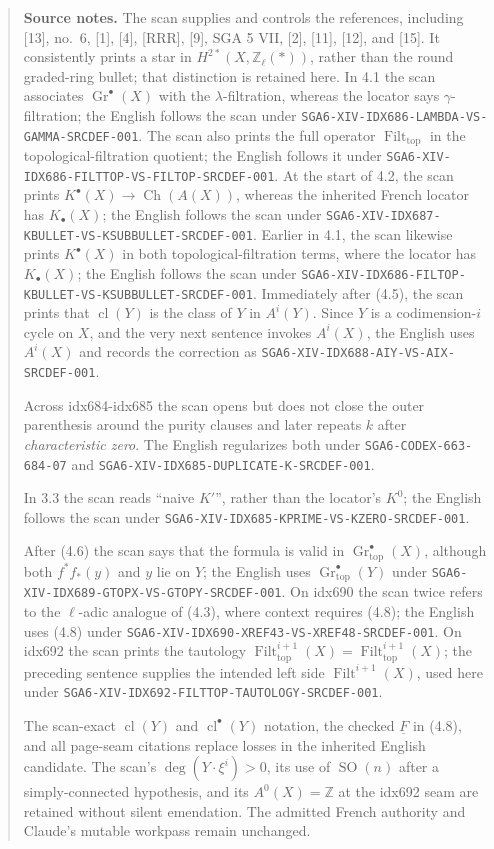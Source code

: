 \documentclass[11pt]{article}
\newcommand{\Z}{\mathbb Z}
\newcommand{\Zell}{\mathbb Z_{\ell}}
\newcommand{\Gtop}{\operatorname{Gr}_{\mathrm{top}}}
\newcommand{\Filt}{\operatorname{Filt}}
\newcommand{\Ch}{\operatorname{Ch}}
\newcommand{\cl}{\operatorname{cl}}
\begin{document}
\begin{quote}\footnotesize\raggedright
\textbf{Source notes.}
The scan supplies and controls the references, including [13], no.~6, [1],
[4], [RRR], [9], SGA 5 VII, [2], [11], [12], and [15]. It consistently
prints a star in $H^{2*}(X,\Zell(*))$, rather than the round graded-ring
bullet; that distinction is retained here. In 4.1 the scan associates
$\operatorname{Gr}^\bullet(X)$ with the $\lambda$-filtration, whereas the
locator says $\gamma$-filtration; the English follows the scan under
\nolinkurl{SGA6-XIV-IDX686-LAMBDA-VS-GAMMA-SRCDEF-001}. The scan also prints
the full operator $\Filt_{\mathrm{top}}$ in the topological-filtration
quotient; the English follows it under
\nolinkurl{SGA6-XIV-IDX686-FILTTOP-VS-FILTOP-SRCDEF-001}. At the start of 4.2,
the scan
prints $K^\bullet(X)\to\Ch(A(X))$, whereas the inherited French locator has
$K_\bullet(X)$; the English follows the scan under
\nolinkurl{SGA6-XIV-IDX687-KBULLET-VS-KSUBBULLET-SRCDEF-001}. Earlier in 4.1, the
scan likewise prints $K^\bullet(X)$ in both topological-filtration terms,
where the locator has $K_\bullet(X)$; the English follows the scan under
\nolinkurl{SGA6-XIV-IDX686-FILTOP-KBULLET-VS-KSUBBULLET-SRCDEF-001}. Immediately after (4.5), the
scan prints that $\cl(Y)$ is the class of $Y$ in $A^i(Y)$. Since $Y$ is a
codimension-$i$ cycle on $X$, and the very next sentence invokes $A^i(X)$,
the English uses $A^i(X)$ and records the correction as
\nolinkurl{SGA6-XIV-IDX688-AIY-VS-AIX-SRCDEF-001}.

Across idx684-idx685 the scan opens but does not close the outer parenthesis
around the purity clauses and later repeats $k$ after \emph{characteristic
zero}. The English regularizes both under
\nolinkurl{SGA6-CODEX-663-684-07} and
\nolinkurl{SGA6-XIV-IDX685-DUPLICATE-K-SRCDEF-001}.

In 3.3 the scan reads ``naive $K'$'', rather than the locator's $K^0$; the
English follows the scan under
\nolinkurl{SGA6-XIV-IDX685-KPRIME-VS-KZERO-SRCDEF-001}.

After (4.6) the scan says that the formula is valid in
$\Gtop^\bullet(X)$, although both $f^*f_*(y)$ and $y$ lie on $Y$; the
English uses $\Gtop^\bullet(Y)$ under
\nolinkurl{SGA6-XIV-IDX689-GTOPX-VS-GTOPY-SRCDEF-001}. On idx690 the scan
twice refers to the $\ell$-adic analogue of (4.3), where context requires
(4.8); the English uses (4.8) under
\nolinkurl{SGA6-XIV-IDX690-XREF43-VS-XREF48-SRCDEF-001}. On idx692 the scan
prints the tautology
$\Filt_{\mathrm{top}}^{i+1}(X)=\Filt_{\mathrm{top}}^{i+1}(X)$; the
preceding sentence supplies the intended left side $\Filt^{i+1}(X)$, used
here under \nolinkurl{SGA6-XIV-IDX692-FILTTOP-TAUTOLOGY-SRCDEF-001}.

The scan-exact $\cl(Y)$ and $\cl^\bullet(Y)$ notation, the checked
$\underline F$ in (4.8), and all page-seam citations replace losses in the
inherited English candidate. The scan's $\deg(Y\cdot\xi^i)>0$, its use of
$\operatorname{SO}(n)$ after a simply-connected hypothesis, and its
$A^0(X)=\Z$ at the idx692 seam are retained without silent emendation.
The admitted French authority and Claude's mutable workpass remain
unchanged.
\end{quote}
\end{document}
